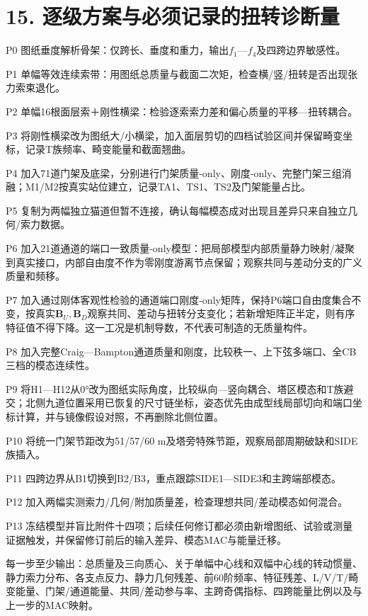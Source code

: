 \documentclass[UTF8,a4paper,11pt,fontset=none]{ctexart}
\begin{document}
\section*{15. 逐级方案与必须记录的扭转诊断量}
P0 图纸垂度解析骨架：仅跨长、垂度和重力，输出\(f_1\)\allowbreak{}—\(f_4\)\allowbreak{}及四跨边界敏感性。\par
P1 单幅等效连续索带：用图纸总质量与截面二次矩，检查横/竖/扭转是否出现张力索束退化。\par
P2 单幅16根面层索＋刚性横梁：检验逐索索力差和偏心质量的平移—扭转耦合。\par
P3 将刚性横梁改为图纸大/小横梁，加入面层剪切的四档试验区间并保留畸变坐标，记录T族频率、畸变能量和截面翘曲。\par
P4 加入71道门架及底梁，分别进行门架质量-only、刚度-only、完整门架三组消融；M1/M2按真实站位建立，记录TA1、TS1、TS2及门架能量占比。\par
P5 复制为两幅独立猫道但暂不连接，确认每幅模态成对出现且差异只来自独立几何/索力数据。\par
P6 加入21道通道的端口一致质量-only模型：把局部模型内部质量静力映射/凝聚到真实接口，内部自由度不作为零刚度游离节点保留；观察共同与差动分支的广义质量和频移。\par
P7 加入通过刚体客观性检验的通道端口刚度-only矩阵，保持P6端口自由度集合不变，按真实\(\mathbf B_U,\allowbreak \mathbf B_D\)\allowbreak{}观察共同、差动与扭转分支变化；若新增矩阵正半定，则有序特征值不得下降。这一工况是机制导数，不代表可制造的无质量构件。\par
P8 加入完整Craig—Bampton通道质量和刚度，比较秩一、上下弦多端口、全CB三档的模态连续性。\par
P9 将H1—H12从0°改为图纸实际角度，比较纵向—竖向耦合、塔区模态和T族避交；北侧九道位置采用已恢复的尺寸链坐标，姿态优先由成型线局部切向和端口坐标计算，并与镜像假设对照，不再删除北侧位置。\par
P10 将统一门架节距改为51/57/60 m及塔旁特殊节距，观察局部周期破缺和SIDE族插入。\par
P11 四跨边界从B1切换到B2/B3，重点跟踪SIDE1—SIDE3和主跨端部模态。\par
P12 加入两幅实测索力/几何/附加质量差，检查理想共同/差动模态如何混合。\par
P13 冻结模型并盲比附件十四项；后续任何修订都必须由新增图纸、试验或测量证据触发，并保留修订前后的输入差异、模态MAC与能量迁移。\par
每一步至少输出：总质量及三向质心、关于单幅中心线和双幅中心线的转动惯量、静力索力分布、各支点反力、静力几何残差、前60阶频率、特征残差、L/V/T/畸变能量、门架/通道能量、共同/差动参与率、主跨奇偶指标、四跨能量比例以及与上一步的MAC映射。\par
{}
\end{document}
